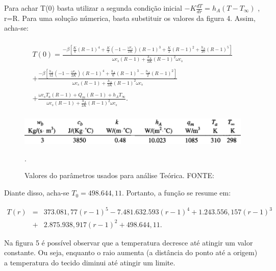 Para achar T(0) basta utilizar a  segunda condição inicial $-K\frac{dT}{dr} = h_{A}(T-T_{\infty})$ , r=R. Para uma solução númerica, basta substituir os valores da figura 4. Assim, acha-se:

\begin{gather*} \nonumber\\
T(0) =  \frac{-\beta\left[\frac{K}{4}(R-1)^{4} + \frac{K}{3}\left(-1-\frac{\omega c_{s}}{2K}\right)(R-1)^{3}+ \frac{K}{2}(R-1)^{2} + \frac{h_{A}}{20}(R-1)^{5}\right]}{\omega c_{s}(R-1) + \frac{h_{A}}{2K}(R-1)^{2}\omega c_{s}}\\\\
+  \frac{-\beta\left[\frac{h_{A}}{12}\left(-1-\frac{\omega c_{s}}{2K}\right)(R-1)^{4} + \frac{h_{A}}{6}(R-1)^{3} - \frac{h_{A}}{2}(R-1)^{2}\right]}{\omega c_{s}(R-1) + \frac{h_{A}}{2K}(R-1)^{2} \omega c_{s}}\\\\
+  \frac{\omega c_{s} T_{a} (R-1) + Q_{m}(R-1) + h_{A}T_{\infty}}{\omega c_{s}(R-1) + \frac{h_{A}}{2K}(R-1)^{2} \omega c_{s}}.\nonumber\\\end{gather*}


\begin{figure}[h]
\centering
\includegraphics[width=15cm]{figuras/tabela.png}
\caption{Valores do parâmetros usados para análise Teórica. FONTE: \cite{Equacao}}.
\label{figura 3:Tabela}
\end{figure}

Diante disso, acha-se $T_{0} = 498.644,11$. Portanto, a função se resume em:

\begin{eqnarray}\nonumber
T(r)&=&373.081,77 (r-1)^5 - 7.481.632.593(r-1)^4 + 1.243.556,157(r-1)^3 \\\nonumber
&+& 2.875.938,917 (r-1)^2 + 498.644,11.
\end{eqnarray}

Na figura 5 é possível observar que  a temperatura decresce até atingir um valor constante. Ou seja, enquanto o raio aumenta (a distância do ponto até a origem) a temperatura do tecido diminui até atingir um limite.

